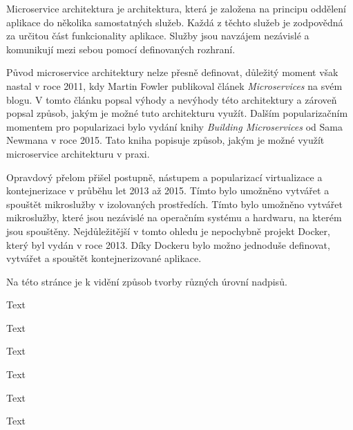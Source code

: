 Microservice architektura je architektura, která je založena na principu oddělení aplikace do několika samostatných služeb. Každá z těchto služeb je zodpovědná za určitou část funkcionality aplikace. Služby jsou navzájem nezávislé a komunikují mezi sebou pomocí definovaných rozhraní. \cite{microservice}

Původ microservice architektury nelze přesně definovat, důležitý moment však nastal v roce 2011, kdy Martin Fowler publikoval článek \textit{Microservices} na svém blogu. V tomto článku popsal výhody a nevýhody této architektury a zároveň popsal způsob, jakým je možné tuto architekturu využít. \cite{fowler} Dalším popularizačním momentem pro popularizaci bylo vydání knihy \textit{Building Microservices} od Sama Newmana v roce 2015. Tato kniha popisuje způsob, jakým je možné využít microservice architekturu v praxi. \cite{newman}

Opravdový přelom přišel postupně, nástupem a popularizací virtualizace a kontejnerizace v průběhu let 2013 až 2015. Tímto bylo umožněno vytvářet a spouštět mikroslužby v izolovaných prostředích. Tímto bylo umožněno vytvářet mikroslužby, které jsou nezávislé na operačním systému a hardwaru, na kterém jsou spouštěny. Nejdůležitější v tomto ohledu je nepochybně projekt Docker, který byl vydán v roce 2013. Díky Dockeru bylo možno jednoduše definovat, vytvářet a spouštět kontejnerizované aplikace. \cite{docker}











Na této stránce je k vidění způsob tvorby různých úrovní nadpisů.

Text

Text

Text

Text

Text

Text



